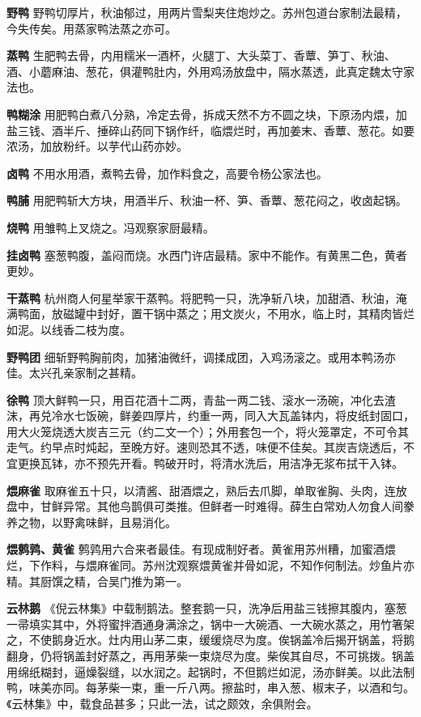 \documentclass[]{article}
\begin{document}
\textbf{野鸭}
野鸭切厚片，秋油郁过，用两片雪梨夹住炮炒之。苏州包道台家制法最精，今失传矣。用蒸家鸭法蒸之亦可。

\textbf{蒸鸭}
生肥鸭去骨，内用糯米一酒杯，火腿丁、大头菜丁、香蕈、笋丁、秋油、酒、小蘑麻油、葱花，俱灌鸭肚内，外用鸡汤放盘中，隔水蒸透，此真定魏太守家法也。

\textbf{鸭糊涂}
用肥鸭白煮八分熟，冷定去骨，拆成天然不方不圆之块，下原汤内煨，加盐三钱、酒半斤、捶碎山药同下锅作纤，临煨烂时，再加姜末、香蕈、葱花。如要浓汤，加放粉纤。以芋代山药亦妙。

\textbf{卤鸭} 不用水用酒，煮鸭去骨，加作料食之，高要令杨公家法也。

\textbf{鸭脯}
用肥鸭斩大方块，用酒半斤、秋油一杯、笋、香蕈、葱花闷之，收卤起锅。

\textbf{烧鸭} 用雏鸭上叉烧之。冯观察家厨最精。

\textbf{挂卤鸭}
塞葱鸭腹，盖闷而烧。水西门许店最精。家中不能作。有黄黑二色，黄者更妙。

\textbf{干蒸鸭}
杭州商人何星举家干蒸鸭。将肥鸭一只，洗净斩八块，加甜酒、秋油，淹满鸭面，放磁罐中封好，置干锅中蒸之；用文炭火，不用水，临上时，其精肉皆烂如泥。以线香二枝为度。

\textbf{野鸭团}
细斩野鸭胸前肉，加猪油微纤，调揉成团，入鸡汤滚之。或用本鸭汤亦佳。太兴孔亲家制之甚精。

\textbf{徐鸭}
顶大鲜鸭一只，用百花酒十二两，青盐一两二钱、滚水一汤碗，冲化去渣沫，再兑冷水七饭碗，鲜姜四厚片，约重一两，同入大瓦盖钵内，将皮纸封固口，用大火笼烧透大炭吉三元（约二文一个）；外用套包一个，将火笼罩定，不可令其走气。约早点时炖起，至晚方好。速则恐其不透，味便不佳矣。其炭吉烧透后，不宜更换瓦钵，亦不预先开看。鸭破开时，将清水洗后，用洁净无浆布拭干入钵。

\textbf{煨麻雀}
取麻雀五十只，以清酱、甜酒煨之，熟后去爪脚，单取雀胸、头肉，连放盘中，甘鲜异常。其他鸟鹊俱可类推。但鲜者一时难得。薛生白常劝人勿食人间豢养之物，以野禽味鲜，且易消化。

\textbf{煨鹩鹑、黄雀}
鹩鹑用六合来者最佳。有现成制好者。黄雀用苏州糟，加蜜酒煨烂，下作料，与煨麻雀同。苏州沈观察煨黄雀并骨如泥，不知作何制法。炒鱼片亦精。其厨馔之精，合吴门推为第一。

\textbf{云林鹅}
《倪云林集》中载制鹅法。整套鹅一只，洗净后用盐三钱擦其腹内，塞葱一帚填实其中，外将蜜拌酒通身满涂之，锅中一大碗酒、一大碗水蒸之，用竹箸架之，不使鹅身近水。灶内用山茅二束，缓缓烧尽为度。俟锅盖冷后揭开锅盖，将鹅翻身，仍将锅盖封好蒸之，再用茅柴一束烧尽为度。柴俟其自尽，不可挑拨。锅盖用绵纸糊封，逼燥裂缝，以水润之。起锅时，不但鹅烂如泥，汤亦鲜美。以此法制鸭，味美亦同。每茅柴一束，重一斤八两。擦盐时，串入葱、椒末子，以酒和匀。《云林集》中，载食品甚多；只此一法，试之颇效，余俱附会。
\end{document}
